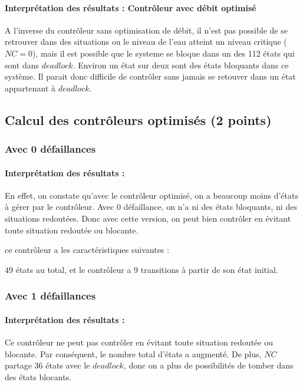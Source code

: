 \documentclass[a4paper]{book}
\begin{document}
\paragraph{Interprétation des résultats : Contrôleur avec débit optimisé}
A l'inverse du contrôleur sans optimisation de débit, il n'est pas possible de se retrouver dans des situations ou le niveau de l'eau atteint un niveau critique ($NC = 0$), mais il est possible que le systeme se bloque dans un des 112 états qui sont dans $deadlock$.
Environ un état sur deux sont des états bloquants dans ce système. Il parait donc difficile de contrôler sans jamais se retouver dans un état appartenant à $deadlock$.

\subsection{Calcul des contrôleurs optimisés (2 points)}

\subsubsection{Avec 0 défaillances}

\paragraph{Interprétation des résultats : }
En effet, on constate qu'avec le contrôleur optimisé, on a beaucoup moins d'états à gérer par le contrôleur.
Avec $0$ défaillance, on n'a ni des états bloquants, ni des situations redoutées. Donc avec cette version, on peut bien contrôler en évitant toute situation redoutée ou blocante.

ce contrôleur a les caractéristiques suivantes :

$49$ états au total, et le contrôleur a 9 transitions à partir de son état initial.

\subsubsection{Avec 1 défaillances}

\paragraph{Interprétation des résultats : }
Ce contrôleur ne peut pas contrôler en évitant toute situation redoutée ou blocante.
Par conséquent, le nombre total d'états a augmenté. De plus, $NC$ partage 36 états avec le $deadlock$, donc on a plus de possibilités de tomber dans des états blocants.
\end{document}
